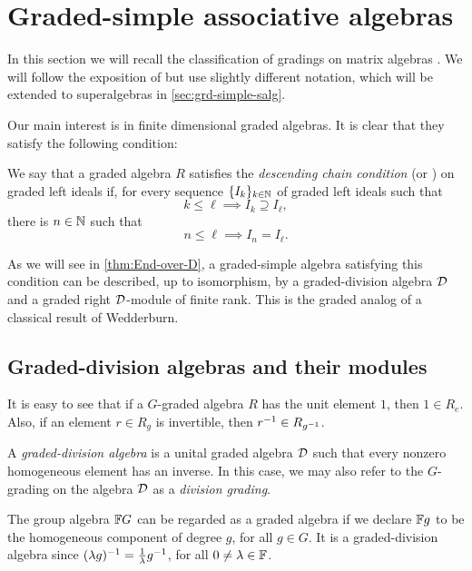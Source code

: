 
\section{Graded-simple associative algebras}\label{sec:gradings-on-matrix-algebras}

In this section we will recall the classification of gradings on matrix algebras \cite{BSZ01, BZ02, BK10}. 
We will follow the exposition of \cite[Chapter 2]{livromicha} but use slightly different notation, which will be extended to superalgebras in \cref{sec:grd-simple-salg}.

Our main interest is in finite dimensional graded algebras. 
It is clear that they satisfy the following condition:

\begin{defi}\label{def:dcc}
    We say that a graded algebra $R$ satisfies the \emph{descending chain condition} (or \emph{\dcc}) on graded left ideals if, for every sequence $\{I_k\}_{k\in \mathbb{N}}$ of graded left ideals such that \[k \leq \ell \implies I_k \supseteq I_\ell,\] there is $n\in \mathbb{N}$ such that \[n \leq \ell \implies I_n = I_\ell.\]
\end{defi}

As we will see in \cref{thm:End-over-D}, a graded-simple algebra satisfying this condition can be described, up to isomorphism, by a graded-division algebra $\mathcal{D}$ and a graded right $\mathcal{D}$-module of finite rank. 
This is the graded analog of a classical result of Wedderburn.

\subsection{Graded-division algebras and their modules}\label{ssec:D-modules}

It is easy to see that if a $G$-graded algebra $R$ has the unit element $1$, then $1 \in R_e$. 
Also, if an element $r\in R_g$ is invertible, then $r^{-1} \in R_{g^{-1}}$.

\begin{defi}\label{def:graded-division-algebra}
    A \emph{graded-division algebra} is a unital graded algebra $\mathcal{D}$ such that every nonzero homogeneous element has an inverse. 
    In this case, we may also refer to the $G$-grading on the algebra $\mathcal{D}$ as a \emph{division grading}.
\end{defi}

\begin{ex}\label{ex:group-algebra}
    The group algebra $\mathbb{F} G$ can be regarded as a graded algebra if we declare $\mathbb{F} g$ to be the homogeneous component of degree $g$, for all $g\in G$. 
    It is a graded-division algebra since $(\lambda g)^{-1} = \frac1\lambda g^{-1}$, for all $0 \neq \lambda \in \mathbb{F}$.
\end{ex}

